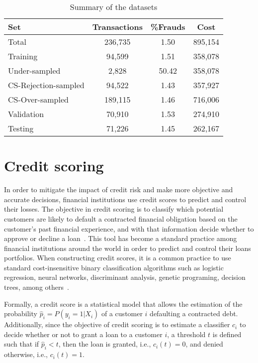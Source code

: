 	\begin{table}[t]
	\caption{Summary of the datasets}
	\label{tab:datasets}
	\centering
	\begin{tabular}{l c c c } %
		\\
		\hline
		\textbf{Set}&	\textbf{Transactions} &	\textbf{\%Frauds} & 
		\textbf{Cost} \\
		\hline
		Total&236,735&1.50&895,154\\
		Training&94,599&1.51&358,078\\
		Under-sampled&2,828&50.42&358,078\\
		CS-Rejection-sampled&94,522&1.43&357,927\\
		CS-Over-sampled&189,115&1.46&716,006\\
		Validation&70,910&1.53&274,910\\
		Testing&71,226&1.45&262,167\\
		\hline
	\end{tabular}
\end{table}


\section{Credit scoring}

  In order to mitigate the impact of credit risk and make more objective and accurate decisions, 
  financial institutions use credit scores to predict and control their losses.
  The objective in credit scoring is to classify which potential customers are likely to default a 
  contracted financial obligation based on the customer's past financial experience, and with that 
  information decide whether to approve or decline a loan~\citep{Anderson2007}. This tool has 
  become a standard practice among financial institutions around the world in order to predict 
  and control their loans portfolios. When constructing credit scores, it is a common practice to 
  use standard cost-insensitive binary classification algorithms such as logistic regression, 
  neural networks, discriminant analysis, genetic programing, decision trees, among 
  others~\citep{Hand1997,Bahnsen2011}. 
  
  Formally, a credit score is a statistical model that allows the estimation of the probability 
  $\hat p_i=P(y_i=1|X_i)$ of a customer $i$ defaulting a contracted debt. Additionally, since the 
  objective of credit scoring is to estimate a classifier $c_i$ to decide whether or not to grant a 
  loan to a customer $i$, a threshold $t$ is defined such that if $\hat p_i <t$, then the loan is 
  granted, i.e., $c_i(t)=0$, and denied otherwise, i.e., $c_i(t)=1$.
  
